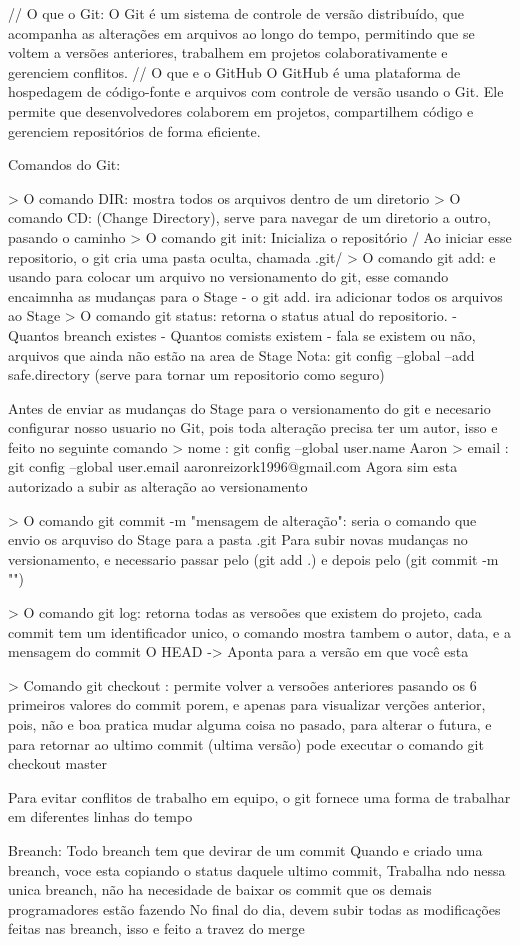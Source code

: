 // O que o Git:
O Git é um sistema de controle de versão distribuído, que acompanha as alterações em arquivos ao longo do tempo, 
permitindo que se voltem a versões anteriores, trabalhem em projetos colaborativamente e gerenciem conflitos.
// O que e o GitHub
O GitHub é uma plataforma de hospedagem de código-fonte e arquivos com controle de versão usando o Git. 
Ele permite que desenvolvedores colaborem em projetos, compartilhem código e gerenciem repositórios de forma eficiente.

Comandos do Git:

> O comando DIR: mostra todos os arquivos dentro de um diretorio
> O comando CD: (Change Directory), serve para navegar de um diretorio a outro, pasando o caminho
> O comando git init: Inicializa o repositório / Ao iniciar esse repositorio, o git cria uma pasta oculta, chamada .git/
> O comando git add:  e usando para colocar um arquivo no versionamento do git, esse comando encaimnha as mudanças para o Stage
    - o git add. ira adicionar todos os arquivos ao Stage 
> O comando git status: retorna o status atual do repositorio. 
    - Quantos breanch existes
    - Quantos comists existem
    - fala se existem ou não, arquivos que ainda não estão na area de Stage
Nota: git config --global --add safe.directory (serve para tornar um repositorio como seguro)

Antes de enviar as mudanças do Stage para o versionamento do git e necesario configurar nosso
usuario no Git, pois toda alteração precisa ter um autor, isso e feito no seguinte comando
> nome : git config --global user.name Aaron
> email : git config --global user.email aaronreizork1996@gmail.com
Agora sim esta autorizado a subir as alteração ao versionamento

> O comando git commit -m "mensagem de alteração": seria  o comando que envio os arquviso do Stage para a pasta .git
Para subir novas mudanças no versionamento, e necessario passar pelo (git add .) e depois pelo (git commit -m "")

> O comando git log: retorna todas as versoões que existem do projeto, cada commit tem um identificador
unico, o comando mostra tambem o autor, data, e a mensagem do commit 
O HEAD -> Aponta para a versão em que você esta

> Comando git checkout : permite volver a versoões anteriores pasando os 6 primeiros valores do commit
porem, e apenas para visualizar verções anterior, pois, não e boa pratica mudar alguma coisa
no pasado, para alterar o futura, e para retornar ao ultimo commit (ultima versão) pode executar o 
comando git checkout master

Para evitar conflitos de trabalho em equipo, o git fornece uma forma de trabalhar em diferentes linhas do tempo

Breanch: Todo breanch tem que devirar de um commit 
Quando e criado uma breanch, voce esta copiando o status daquele ultimo commit,
Trabalha ndo nessa unica breanch, não ha necesidade de baixar os commit que os demais programadores estão fazendo
No final do dia, devem subir todas as modificações feitas nas breanch, isso e feito a travez do merge

 